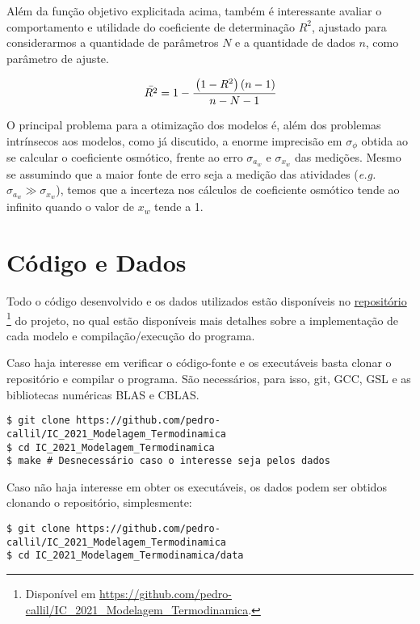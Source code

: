 \documentclass[
	12pt,				%
	openright,
	twoside,
	a4paper,			%
	english,			%
	french,				%
	brazil				%
	]{abntex2}
\begin{document}
Além da função objetivo explicitada acima, também é interessante avaliar o
comportamento e utilidade do coeficiente de determinação $R^2$, ajustado para
considerarmos a quantidade de parâmetros $N$ e a quantidade de dados $n$, como
parâmetro de ajuste.

\begin{equation}
	\bar{R^2} = 1 - \cfrac{\left( 1 - R^2 \right) \left( n - 1 \right)}
		{n - N - 1}
\end{equation}

O principal problema para a otimização dos modelos é, além dos problemas
intrínsecos aos modelos, como já discutido, a enorme imprecisão em
$\sigma_\phi$ obtida ao se calcular o coeficiente osmótico, frente ao erro
$\sigma_{a_w}$ e $\sigma_{x_w}$ das medições. Mesmo se assumindo que a maior
fonte de erro seja a medição das atividades (\textit{e.g.} $\sigma_{a_w} \gg
\sigma_{x_w}$), temos que a incerteza nos cálculos de coeficiente osmótico
tende ao infinito quando o valor de $x_w$ tende a 1.

\chapter{Código e Dados}

Todo o código desenvolvido e os dados utilizados estão disponíveis no
\href{https://github.com/pedro-callil/IC_2021_Modelagem_Termodinamica}{repositório}
\footnote{Disponível em
	\url{https://github.com/pedro-callil/IC_2021_Modelagem_Termodinamica}.}
do projeto, no qual estão disponíveis mais detalhes sobre a implementação de
cada modelo e compilação/execução do programa.

Caso haja interesse em verificar o código-fonte e os executáveis basta clonar o
repositório e compilar o programa. São necessários, para isso, git, GCC, GSL e as
bibliotecas numéricas BLAS e CBLAS.

\begin{verbatim}
$ git clone https://github.com/pedro-callil/IC_2021_Modelagem_Termodinamica
$ cd IC_2021_Modelagem_Termodinamica
$ make # Desnecessário caso o interesse seja pelos dados
\end{verbatim}

Caso não haja interesse em obter os executáveis, os dados podem ser obtidos
clonando o repositório, simplesmente:

\begin{verbatim}
$ git clone https://github.com/pedro-callil/IC_2021_Modelagem_Termodinamica
$ cd IC_2021_Modelagem_Termodinamica/data
\end{verbatim}
\end{document}
